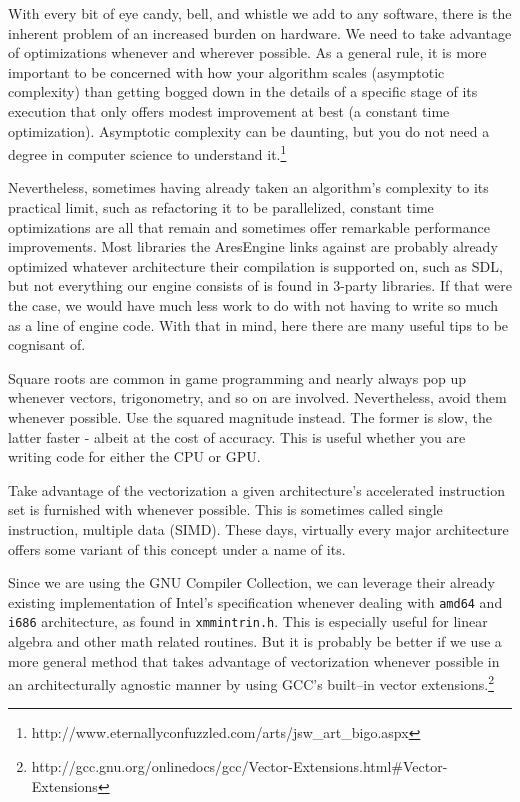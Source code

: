 With every bit of eye candy, bell, and whistle we add to any software, there is the inherent problem of an increased burden on hardware. We need to take advantage of optimizations whenever and wherever possible. As a general rule, it is more important to be concerned with how your algorithm scales (asymptotic complexity) than getting bogged down in the details of a specific stage of its execution that only offers modest improvement at best (a constant time optimization). Asymptotic complexity can be daunting, but you do not need a degree in computer science to understand it.\footnote{http://www.eternallyconfuzzled.com/arts/jsw_art_bigo.aspx}

Nevertheless, sometimes having already taken an algorithm's complexity to its practical limit, such as refactoring it to be parallelized, constant time optimizations are all that remain and sometimes offer remarkable performance improvements. Most libraries the AresEngine links against are probably already optimized whatever architecture their compilation is supported on, such as SDL, but not everything our engine consists of is found in 3-party libraries. If that were the case, we would have much less work to do with not having to write so much as a line of engine code. With that in mind, here there are many useful tips to be cognisant of.

Square roots are common in game programming and nearly always pop up whenever vectors, trigonometry, and so on are involved. Nevertheless, avoid them whenever possible. Use the squared magnitude instead. The former is slow, the latter faster - albeit at the cost of accuracy. This is useful whether you are writing code for either the CPU or GPU.

Take advantage of the vectorization a given architecture's accelerated instruction set is furnished with whenever possible. This is sometimes called single instruction, multiple data (SIMD). These days, virtually every major architecture offers some variant of this concept under a name of its.

Since we are using the GNU Compiler Collection, we can leverage their already existing implementation of Intel's specification whenever dealing with {\tt amd64} and {\tt i686} architecture, as found in {\tt xmmintrin.h}. This is especially useful for linear algebra and other math related routines. But it is probably be better if we use a more general method that takes advantage of vectorization whenever possible in an architecturally agnostic manner by using GCC's built--in vector extensions.\footnote{http://gcc.gnu.org/onlinedocs/gcc/Vector-Extensions.html\#Vector-Extensions}

